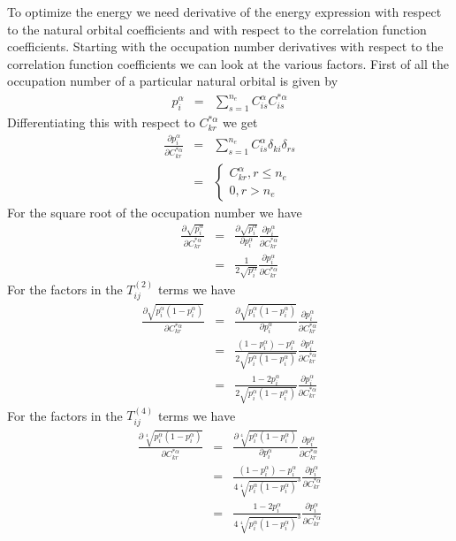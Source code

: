 \documentclass[pra]{revtex4-1}
\begin{document}
To optimize the energy we need derivative of the energy expression with respect to the
natural orbital coefficients and with respect to the correlation function coefficients.
Starting with the occupation number derivatives with respect to the correlation 
function coefficients we can look at the various factors.
First of all the occupation number of a particular natural orbital is given by
\begin{eqnarray}
   p_i^\alpha &=& \sum_{s=1}^{n_e}C_{is}^\alpha C_{is}^{*\alpha}
\end{eqnarray}
Differentiating this with respect to $C_{kr}^{*\alpha}$ we get
\begin{eqnarray}
   \frac{\partial p_i^\alpha}{\partial C_{kr}^{*\alpha}}
   &=& \sum_{s=1}^{n_e}C_{is}^\alpha \delta_{ki}\delta_{rs} \\
   &=& \left\{
       \begin{array}{l}
         C_{kr}^\alpha, r \le n_e \\
         0, r > n_e
       \end{array}
       \right.
\end{eqnarray}
For the square root of the occupation number we have
\begin{eqnarray}
   \frac{\partial \sqrt{p_i^\alpha}}{\partial C_{kr}^{*\alpha}}
   &=& \frac{\partial \sqrt{p_i^\alpha}}{\partial p_i^\alpha}
       \frac{\partial p_i^\alpha}{\partial C_{kr}^{*\alpha}} \\
   &=& \frac{1}{2\sqrt{p_i^\alpha}}\frac{\partial p_i^\alpha}{\partial C_{kr}^{*\alpha}}
\end{eqnarray}
For the factors in the $T_{ij}^{(2)}$ terms we have
\begin{eqnarray}
   \frac{\partial \sqrt{p_i^\alpha(1-p_i^\alpha)}}{\partial C_{kr}^{*\alpha}}
   &=& \frac{\partial \sqrt{p_i^\alpha(1-p_i^\alpha)}}{\partial p_i^\alpha}
       \frac{\partial p_i^\alpha}{\partial C_{kr}^{*\alpha}} \\
   &=& \frac{(1-p_i^\alpha)-p_i^\alpha}{2\sqrt{p_i^\alpha(1-p_i^\alpha)}}
       \frac{\partial p_i^\alpha}{\partial C_{kr}^{*\alpha}} \\
   &=& \frac{1-2p_i^\alpha}{2\sqrt{p_i^\alpha(1-p_i^\alpha)}}
       \frac{\partial p_i^\alpha}{\partial C_{kr}^{*\alpha}}
\end{eqnarray}
For the factors in the $T_{ij}^{(4)}$ terms we have
\begin{eqnarray}
   \frac{\partial \sqrt[4]{p_i^\alpha(1-p_i^\alpha)}}{\partial C_{kr}^{*\alpha}}
   &=& \frac{\partial \sqrt[4]{p_i^\alpha(1-p_i^\alpha)}}{\partial p_i^\alpha}
       \frac{\partial p_i^\alpha}{\partial C_{kr}^{*\alpha}} \\
   &=& \frac{(1-p_i^\alpha)-p_i^\alpha}{4\sqrt[4]{p_i^\alpha(1-p_i^\alpha)}^3}
       \frac{\partial p_i^\alpha}{\partial C_{kr}^{*\alpha}} \\
   &=& \frac{1-2p_i^\alpha}{4\sqrt[4]{p_i^\alpha(1-p_i^\alpha)}^3}
       \frac{\partial p_i^\alpha}{\partial C_{kr}^{*\alpha}}
\end{eqnarray}
\end{document}

